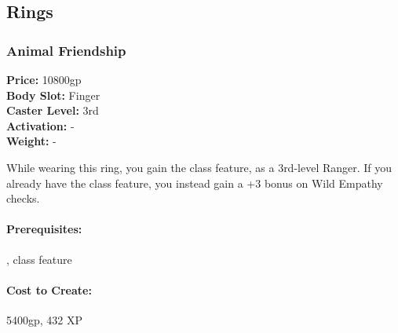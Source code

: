 \subsection{Rings}
\subsubsection{Animal Friendship}
\label{Item:AnimalFriendship}
   \textbf{Price:} 10800gp
\\ \textbf{Body Slot:} Finger
\\ \textbf{Caster Level:} 3rd
\\ \textbf{Activation:} -
\\ \textbf{Weight:} -

While wearing this ring, you gain the  class feature, as a 3rd-level Ranger. If you already have the class feature, you instead gain a +3 bonus on Wild Empathy checks.



\paragraph{Prerequisites:} ,  class feature

\paragraph{Cost to Create:} 5400gp, 432 XP
% 
% 
% 

